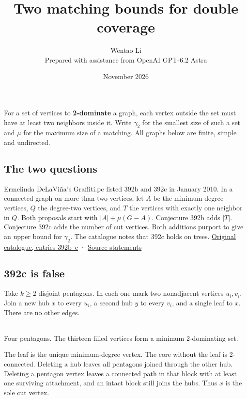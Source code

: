 \documentclass[11pt]{article}
\title{Two matching bounds for double coverage}
\author{Wentao Li\\\small Prepared with assistance from OpenAI GPT-6.2 Astra}
\date{November 2026}
\begin{document}
\maketitle
For a set of vertices to \textbf{2-dominate} a graph, each vertex outside the set must have at least two neighbors inside it. Write \(\gamma_2\) for the smallest size of such a set and \(\mu\) for the maximum size of a matching. All graphs below are finite, simple and undirected.

\subsection{The two questions}\label{the-two-questions}

Ermelinda DeLaViña's Graffiti.pc listed 392b and 392c in January 2010. In a connected graph on more than two vertices, let \(A\) be the minimum-degree vertices, \(Q\) the degree-two vertices, and \(T\) the vertices with exactly one neighbor in \(Q\). Both proposals start with \(|A|+\mu(G-A)\). Conjecture 392b adds \(|T|\). Conjecture 392c adds the number of cut vertices. Both additions purport to give an upper bound for \(\gamma_2\). The catalogue notes that 392c holds on trees. \href{https://www.uhd.edu/academics/sciences/mathematics-statistics/wowii/index.html}{Original catalogue, entries 392b--c} · \href{https://www.uhd.edu/academics/sciences/mathematics-statistics/wowii/files/conjectures.json}{Source statements}

\subsection{392c is false}\label{c-is-false}

Take \(k\ge2\) disjoint pentagons. In each one mark two nonadjacent vertices \(u_i,v_i\). Join a new hub \(x\) to every \(u_i\), a second hub \(y\) to every \(v_i\), and a single leaf to \(x\). There are no other edges.

\begin{center}\\{\small Four pentagons. The thirteen filled vertices form a minimum 2-dominating set.}\end{center}

The leaf is the unique minimum-degree vertex. The core without the leaf is 2-connected. Deleting a hub leaves all pentagons joined through the other hub. Deleting a pentagon vertex leaves a connected path in that block with at least one surviving attachment, and an intact block still joins the hubs. Thus \(x\) is the sole cut vertex.
\end{document}
